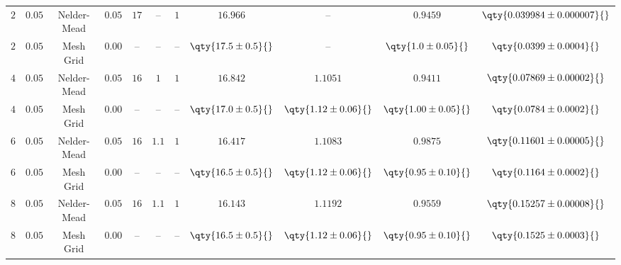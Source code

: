 \begin{tabular}{cc|ccccc|cccc}
    \rowcolor{LightCyan}
    $2$ & $0.05$ & Nelder-Mead & $0.05$ & $17$ & -- & $1$ & $16.966$ & -- & $0.9459$ & $\qty{0.039984 \pm 0.000007}{}$ \\
    $2$ & $0.05$ & Mesh Grid & $0.00$ & -- & -- & -- & $\qty{17.5 \pm 0.5}{}$ & -- & $\qty{1.0 \pm 0.05}{}$ & $\qty{0.0399 \pm 0.0004}{}$ \\
    \rowcolor{LightCyan}
    $4$ & $0.05$ & Nelder-Mead & $0.05$ & $16$ & $1$ & $1$ & $16.842$ & $1.1051$ & $0.9411$ & $\qty{0.07869 \pm 0.00002}{}$ \\
    $4$ & $0.05$ & Mesh Grid & $0.00$ & -- & -- & -- & $\qty{17.0 \pm 0.5}{}$ & $\qty{1.12 \pm 0.06}{}$ & $\qty{1.00 \pm 0.05}{}$ & $\qty{0.0784 \pm 0.0002}{}$ \\
    \rowcolor{LightCyan}
    $6$ & $0.05$ & Nelder-Mead & $0.05$ & $16$ & $1.1$ & $1$ & $16.417$ & $1.1083$ & $0.9875$ & $\qty{0.11601 \pm 0.00005}{}$ \\
    $6$ & $0.05$ & Mesh Grid & $0.00$ & -- & -- & -- & $\qty{16.5 \pm 0.5}{}$ & $\qty{1.12 \pm 0.06}{}$ & $\qty{0.95 \pm 0.10}{}$ & $\qty{0.1164 \pm 0.0002}{}$ \\
    \rowcolor{LightCyan}
    $8$ & $0.05$ & Nelder-Mead & $0.05$ & $16$ & $1.1$ & $1$ & $16.143$ & $1.1192$ & $0.9559$ & $\qty{0.15257 \pm 0.00008}{}$ \\
    $8$ & $0.05$ & Mesh Grid & $0.00$ & -- & -- & -- & $\qty{16.5 \pm 0.5}{}$ & $\qty{1.12 \pm 0.06}{}$ & $\qty{0.95 \pm 0.10}{}$ & $\qty{0.1525 \pm 0.0003}{}$ \\
\end{tabular}